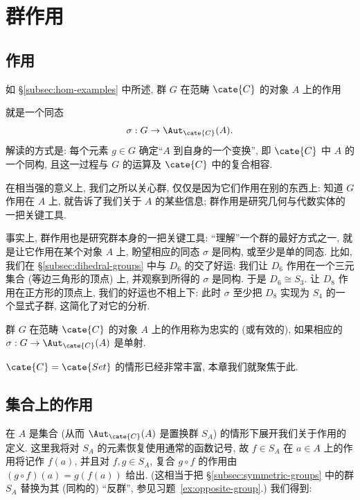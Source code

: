 \section{群作用}
\label{sec:group-actions}

\subsection{作用}
\label{subsec:actions}

如 \S\ref{subsec:hom-examples} 中所述, 群 $G$ 在范畴 $\cate{C}$ 的对象 $A$ 上的作用%

就是一个同态
\[
\sigma : G \to \Aut_{\cate{C}}(A).
\]
解读的方式是: 每个元素 $g \in G$ 确定``$A$ 到自身的一个变换'', 即 $\cate{C}$ 中 $A$ 的一个同构, 且这一过程与 $G$ 的运算及 $\cate{C}$ 中的复合相容.

在相当强的意义上, 我们之所以关心群, 仅仅是因为它们作用在别的东西上: 知道 $G$ 作用在 $A$ 上, 就告诉了我们关于 $A$ 的某些信息; 群作用是研究几何与代数实体的一把关键工具.

事实上, 群作用也是研究群本身的一把关键工具: ``理解''一个群的最好方式之一, 就是让它作用在某个对象 $A$ 上, 盼望相应的同态 $\sigma$ 是同构, 或至少是单的同态. 比如, 我们在 \S\ref{subsec:dihedral-groups} 中与 $D_6$ 的交了好运: 我们让 $D_6$ 作用在一个三元集合 (等边三角形的顶点) 上, 并观察到所得的 $\sigma$ 是同构. 于是 $D_6 \cong S_3$. 让 $D_8$ 作用在正方形的顶点上, 我们的好运也不相上下: 此时 $\sigma$ 至少把 $D_8$ 实现为 $S_4$ 的一个显式子群, 这简化了对它的分析.

\begin{definition}
\label{def:faithful}
群 $G$ 在范畴 $\cate{C}$ 的对象 $A$ 上的作用称为忠实的%
(或有效的), 如果相应的 $\sigma : G \to \Aut_{\cate{C}}(A)$ 是单射.
\end{definition}

$\cate{C} = \cate{Set}$ 的情形已经非常丰富, 本章我们就聚焦于此.

\subsection{集合上的作用}
\label{subsec:actions-sets}

在 $A$ 是集合 (从而 $\Aut_{\cate{C}}(A)$ 是置换群 $S_A$) 的情形下展开我们关于作用的定义. 这里我将对 $S_A$ 的元素恢复使用通常的函数记号, 故 $f \in S_A$ 在 $a \in A$ 上的作用将记作 $f(a)$, 并且对 $f, g \in S_A$, 复合 $g \circ f$ 的作用由 $(g \circ f)(a) = g(f(a))$ 给出. (这相当于把 \S\ref{subsec:symmetric-groups} 中的群 $S_A$ 替换为其 (同构的) ``反群'', 参见习题~\ref{ex:opposite-group}.) 我们得到:


